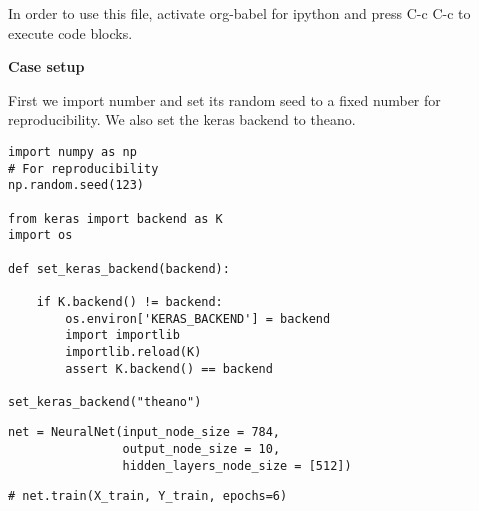 \documentclass[11pt]{article}
\author{grokkingStuff}
\date{\today}
\title{}
\begin{document}
\tableofcontents

In order to use this file, activate org-babel for ipython and press C-c C-c to execute code blocks.

\textbf{Case setup}

First we import number and set its random seed to a fixed number for reproducibility.
We also set the keras backend to theano.

\begin{verbatim}
import numpy as np
# For reproducibility
np.random.seed(123)

from keras import backend as K
import os

def set_keras_backend(backend):

    if K.backend() != backend:
        os.environ['KERAS_BACKEND'] = backend
        import importlib
        importlib.reload(K)
        assert K.backend() == backend

set_keras_backend("theano")
\end{verbatim}

\begin{verbatim}
net = NeuralNet(input_node_size = 784,
                output_node_size = 10,
                hidden_layers_node_size = [512])
\end{verbatim}

\begin{verbatim}
# net.train(X_train, Y_train, epochs=6)
\end{verbatim}
\end{document}
